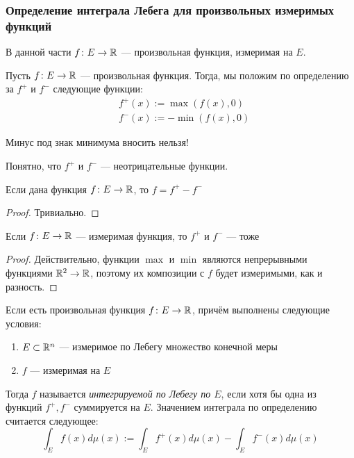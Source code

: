 \subsubsection*{Определение интеграла Лебега для произвольных измеримых функций}

\begin{note}
	В данной части $f \colon E \to \mathbb{R}$ --- произвольная функция, измеримая на $E$.
\end{note}

\begin{definition}
	Пусть $f \colon E \to \mathbb{R}$ --- произвольная функция. Тогда, мы положим по определению за $f^+$ и $f^-$ следующие функции:
	\begin{align*}
		&{f^+(x) := \max(f(x), 0)}
		\\
		&{f^-(x) := -\min(f(x), 0)}
	\end{align*}
\end{definition}

\begin{anote}
	Минус под знак минимума вносить нельзя!
\end{anote}

\begin{note}
	Понятно, что $f^+$ и $f^-$ --- неотрицательные функции.
\end{note}

\begin{proposition}
	Если дана функция $f \colon E \to \mathbb{R}$, то $f = f^+ - f^-$
\end{proposition}

\begin{proof}
	Тривиально.
\end{proof}

\begin{proposition}
	Если $f \colon E \to \mathbb{R}$ --- измеримая функция, то $f^+$ и $f^-$ --- тоже
\end{proposition}

\begin{proof}
	Действительно, функции $\max$ и $\min$ являются непрерывными функциями $\mathbb{R}^2 \to \mathbb{R}$, поэтому их композиции с $f$ будет измеримыми, как и разность.
\end{proof}

\begin{definition}
	Если есть произвольная функция $f \colon E \to \mathbb{R}$, причём выполнены следующие условия:
	\begin{enumerate}
		\item $E \subset \mathbb{R}^n$ --- измеримое по Лебегу множество конечной меры
		
		\item $f$ --- измеримая на $E$
	\end{enumerate}
	Тогда $f$ называется \textit{интегрируемой по Лебегу по $E$}, если хотя бы одна из функций $f^+, f^-$ суммируется на $E$. Значением интеграла по определению считается следующее:
	\[
		\int_E f(x)d\mu(x) := \int_E f^+(x)d\mu(x) - \int_E f^-(x)d\mu(x)
	\]
\end{definition}

